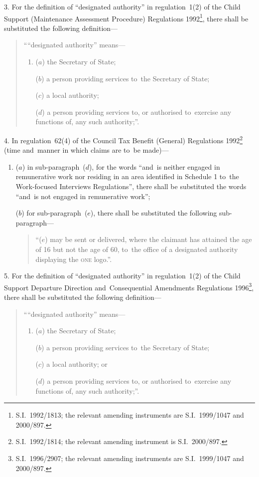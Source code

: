 \documentclass[12pt,a4paper]{article}
\begin{document}
\medskip

3.  For the definition of “designated authority” in regulation~1(2) of the Child Support (Maintenance Assessment Procedure) Regulations 1992\footnote{S.I.~1992/1813; the relevant amending instruments are S.I.~1999/1047 and 2000/897.}, there shall be substituted the following definition—
\begin{quotation}
    ““designated authority” means—
\begin{enumerate}\item[]
    ($a$) 
    the Secretary of State;

    ($b$) 
    a person providing services to~the Secretary of State;

    ($c$) 
    a local authority;

    ($d$) 
    a person providing services to, or authorised to~exercise any functions of, any such authority;”. 
\end{enumerate}
\end{quotation}

\medskip

4.  In regulation~62(4) of the Council Tax Benefit (General) Regulations 1992\footnote{S.I.~1992/1814; the relevant amending instrument is S.I.~2000/897.} (time and~manner in which claims are to~be made)—
\begin{enumerate}\item[]
($a$) in sub-paragraph~($d$), for the words “and~is neither engaged in remunerative work nor residing in an area identified in Schedule 1 to~the Work-focused Interviews Regulations”, there shall be substituted the words “and~is not engaged in remunerative work”;

($b$) for sub-paragraph~($e$), there shall be substituted the following sub-paragraph—
\begin{quotation}
“($e$) may be sent or delivered, where the claimant has attained the age of 16 but not the age of 60, to~the office of a designated authority displaying the \textsc{\lowercase{ONE}} logo.”.
\end{quotation}
\end{enumerate}

\medskip

5.  For the definition of “designated authority” in regulation~1(2) of the Child Support Departure Direction and~Consequential Amendments Regulations 1996\footnote{S.I.~1996/2907; the relevant amending instruments are S.I.~1999/1047 and 2000/897.}, there shall be substituted the following definition—
\begin{quotation}
    ““designated authority” means—
\begin{enumerate}\item[]
    ($a$) 
    the Secretary of State;

    ($b$) 
    a person providing services to~the Secretary of State;

    ($c$) 
    a local authority; or

    ($d$) 
    a person providing services to, or authorised to~exercise any functions of, any such authority;”.
\end{enumerate}
\end{quotation}
\end{document}
